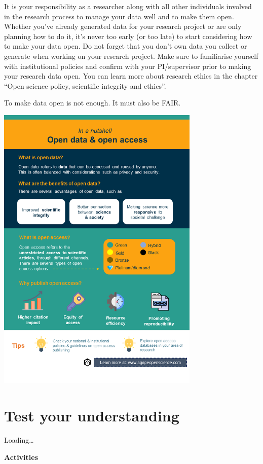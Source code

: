 \documentclass[
]{book}
\begin{document}
It is your responsibility as a researcher along with all other individuals involved in the research process to manage your data well and to make them open. Whether you've already generated data for your research project or are only planning how to do it, it's never too early (or too late) to start considering how to make your data open. Do not forget that you don't own data you collect or generate when working on your research project. Make sure to familiarise yourself with institutional policies and confirm with your PI/supervisor prior to making your research data open. You can learn more about research ethics in the chapter ``Open science policy, scientific integrity and ethics''.

To make data open is not enough. It must also be FAIR.

\includegraphics[width=3.8125in,height=\textheight]{images/slide2.png}

\hypertarget{test-your-understanding-3}{%
\section{Test your understanding}\label{test-your-understanding-3}}

Loading\ldots{}

\textbf{Activities}
\end{document}
